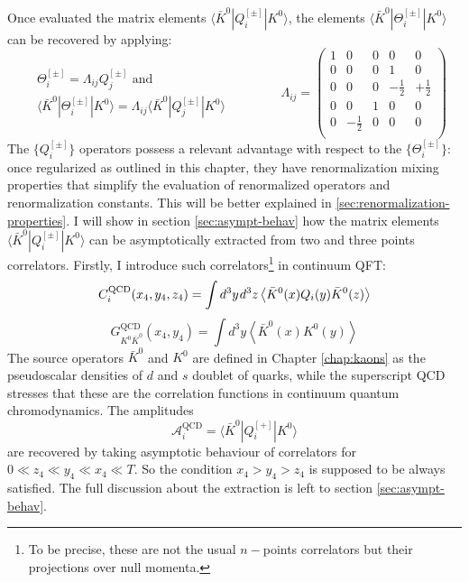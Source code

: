\documentclass[english, LaM, oneside, noexaminfo]{sapthesis}
\newcommand{\la}{\langle}
\newcommand{\ra}{\rangle}
\begin{document}
Once evaluated the matrix elements $\la \bar K^0 | Q_i^{[\pm]} | K^0 \ra$, the elements $\la \bar K^0 | \Theta_i^{[\pm]} | K^0 \ra$ can be recovered by applying:
\begin{equation*}
    \begin{split}
        & \Theta_i^{[\pm]} = \Lambda_{ij} Q_j^{[\pm]}  \text{ and}\\
        & \la \bar K^0 | \Theta_i^{[\pm]} | K^0 \ra =\Lambda_{ij} \la \bar K^0 | Q_j^{[\pm]} | K^0 \ra
    \end{split}
    \qquad\qquad
    \Lambda_{ij} = 
    \begin{pmatrix}
        1 & 0 & 0 & 0 & 0 \\
        0 & 0 & 0 & 1 & 0 \\
        0 & 0 & 0 & -\frac{1}{2} & +\frac{1}{2} \\
        0 & 0 & 1 & 0 & 0 \\
        0 & -\frac{1}{2} & 0 & 0 & 0 \\
    \end{pmatrix}
\end{equation*}
The $\{Q_i^{[\pm]}\}$ operators possess a relevant advantage with respect to the $\{\Theta_i^{[\pm]}\}$:
once regularized as outlined in this chapter, they have renormalization mixing properties that simplify the evaluation of renormalized operators and renormalization constants.
This will be better explained in \ref{sec:renormalization-properties}.
\newline
I will show in section \ref{sec:asympt-behav} how the matrix elements $\la \bar K^0 | Q_i^{[\pm]} | K^0 \ra$ can be asymptotically extracted from two and three points correlators.
Firstly, I introduce such correlators\footnote{To be precise, these are not the usual $n-$points correlators but their projections over null momenta.} in continuum QFT:
\begin{equation}\label{eq:3pts-correlators}
    C_i^\text{QCD}(x_4,y_4,z_4) = \int d^3y \hspace*{.3mm} d^3z \left\la \bar K^0(x) Q_i(y) \bar K^0(z) \right\ra
\end{equation}
\begin{equation*}
    G_{K^0 \bar K^0}^\text{QCD}(x_4,y_4) = \int d^3y \left\la \bar K^0(x) K^0(y) \right\ra
\end{equation*}
The source operators $\bar K^0$ and $K^0$ are defined in Chapter \ref{chap:kaons} as the pseudoscalar densities of $d$ and $s$ doublet of quarks, while the superscript QCD stresses that these are the correlation functions in continuum quantum chromodynamics.
The amplitudes $$\mathcal{A}_i^\text{QCD} = \la \bar K^0 | Q_i^{[+]} | K^0 \ra$$ are recovered by taking asymptotic behaviour of correlators for $0 \ll z_4 \ll y_4 \ll x_4 \ll T$.
So the condition $x_4 > y_4 > z_4$ is supposed to be always satisfied.
The full discussion about the extraction is left to section \ref{sec:asympt-behav}.
\end{document}
